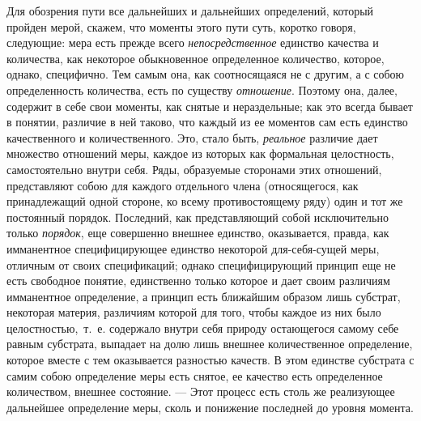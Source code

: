Для обозрения пути все дальнейших и дальнейших определений, который пройден
мерой, скажем, что моменты этого пути суть, коротко говоря, следующие: мера
есть прежде всего {\em непосредственное} единство
качества и количества, как некоторое обыкновенное определенное количество,
которое, однако, специфично. Тем самым она, как соотносящаяся не с другим,
а с собою определенность количества, есть по существу
{\em отношение}. Поэтому она, далее, содержит в себе
свои моменты, как снятые и нераздельные; как это всегда бывает в понятии,
различие в ней таково, что каждый из ее моментов сам есть единство
качественного и количественного. Это, стало быть,
{\em реальное} различие дает множество отношений меры,
каждое из которых как формальная целостность, самостоятельно внутри себя.
Ряды, образуемые сторонами этих отношений, представляют собою для каждого
отдельного члена (относящегося, как принадлежащий одной стороне, ко всему
противостоящему ряду) один и тот же постоянный порядок. Последний, как
представляющий собой исключительно только
{\em порядок}, еще совершенно внешнее единство,
оказывается, правда, как имманентное специфицирующее единство некоторой
для-себя-сущей меры, отличным от своих спецификаций; однако специфицирующий
принцип еще не есть свободное понятие, единственно только которое и дает
своим различиям имманентное определение, а принцип есть ближайшим образом
лишь субстрат, некоторая материя, различиям которой для того, чтобы каждое
из них было целостностью,~т.~е. содержало внутри себя природу остающегося
самому себе равным субстрата, выпадает на долю лишь внешнее количественное
определение, которое вместе с тем оказывается разностью качеств. В этом
единстве субстрата с самим собою определение меры есть снятое, ее качество
есть определенное количеством, внешнее состояние. — Этот процесс есть столь
же реализующее дальнейшее определение меры, сколь и понижение последней до
уровня момента.

